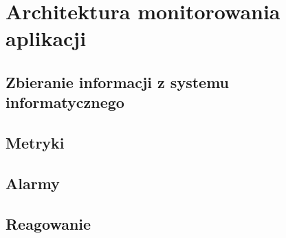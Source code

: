\chapter{Architektura monitorowania aplikacji}
\label{chapter:monitoring_architecture}




\section{Zbieranie informacji z systemu informatycznego}
\section{Metryki}
\section{Alarmy}
\section{Reagowanie}